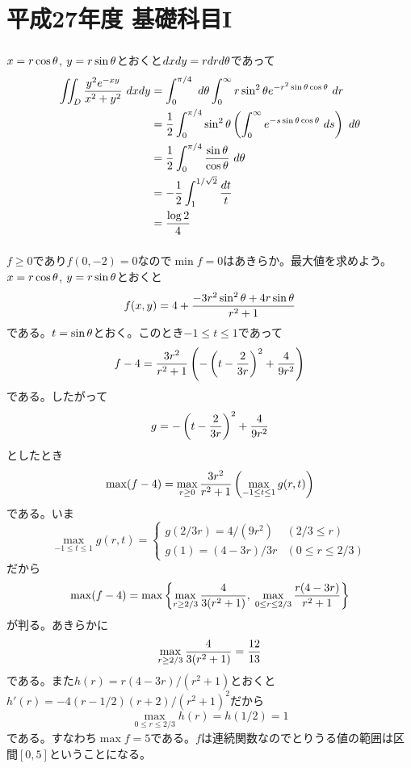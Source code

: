 \section{平成27年度 基礎科目I}

\subsubsection{} %
\begin{sol}
  $x=r \cos {\theta}$, $y = r\sin {\theta}$とおくと$dx dy = r dr d{\theta}$であって
  \begin{align*}
    \iint_D \frac{y^2 e^{-xy} }{ x^2 + y^2 } \ dx dy &= \int_0^{\pi/4} \ d{\theta} \int_0^{\infty} r \sin^2 {\theta} e^{- r^2 \sin {\theta} \cos {\theta}} \ dr \\
    &= \frac{1}{2} \int_0^{\pi/4} \sin^2 {\theta} \left( \int_0^{\infty}   e^{- s \sin {\theta} \cos {\theta}} \ ds \right) \ d{\theta} \\
    &= \frac{1}{2} \int_0^{\pi/4} \frac{ \sin {\theta} }{\cos {\theta} } \ d{\theta} \\
    &= - \frac{1}{2} \int_1^{1/ \sqrt{2} } \frac{dt}{t} \\
    &= \frac{\log 2}{4}
  \end{align*}
\end{sol}

\newpage

\subsubsection{} %
\begin{sol}
  $f \geq 0$であり$f(0,-2) = 0$なので$\min f = 0$はあきらか。最大値を求めよう。$x = r \cos {\theta}$, $y = r \sin {\theta}$とおくと
  \[
  f(x,y) = 4 + \frac{ - 3 r^2 \sin^2 {\theta} + 4r \sin {\theta} }{ r^2 + 1 }
  \]
  である。$t = \sin {\theta}$とおく。このとき$-1 \leq t \leq 1$であって
  \[
  f-4 = \frac{ 3r^2}{r^2 +1} \left( -\left( t - \frac{2}{3r} \right)^2+ \frac{4}{9r^2} \right)
  \]
  である。したがって
  \[
  g = -\left( t - \frac{2}{3r} \right)^2+ \frac{4}{9r^2}
  \]
  としたとき
  \[
  \max (f -4) = \max_{r \geq 0} \frac{ 3r^2}{r^2 +1} \left( \max_{-1 \leq t \leq 1} g(r,t) \right)
  \]
  である。いま
  \[
  \max_{-1 \leq t \leq 1} g(r,t) = \begin{cases}
  g(2/3r) = 4/(9r^2) &(2/3 \leq r) \\
  g(1) = (4-3r)/3r &(0 \leq r \leq 2/3)
\end{cases}
  \]
  だから
  \[
  \max (f-4) = \max \left\{  \max_{r \geq 2/3} \frac{4}{3(r^2 + 1)} , \; \max_{0 \leq r \leq 2/3} \frac{r(4-3r)}{r^2+1} \right\}
  \]
  が判る。あきらかに
  \[
  \max_{r \geq 2/3} \frac{4}{3(r^2 + 1)} = \frac{12}{13}
  \]
である。また$h(r) = r(4-3r)/ (r^2+1)$とおくと$h'(r) = -4(r - 1/2)(r+2)/ (r^2 + 1)^2 $だから
\[
\max_{0 \leq r \leq 2/3} h(r) = h(1/2) =1
\]
である。すなわち$\max f = 5$である。$f$は連続関数なのでとりうる値の範囲は区間$[0, 5]$ということになる。
\end{sol}


